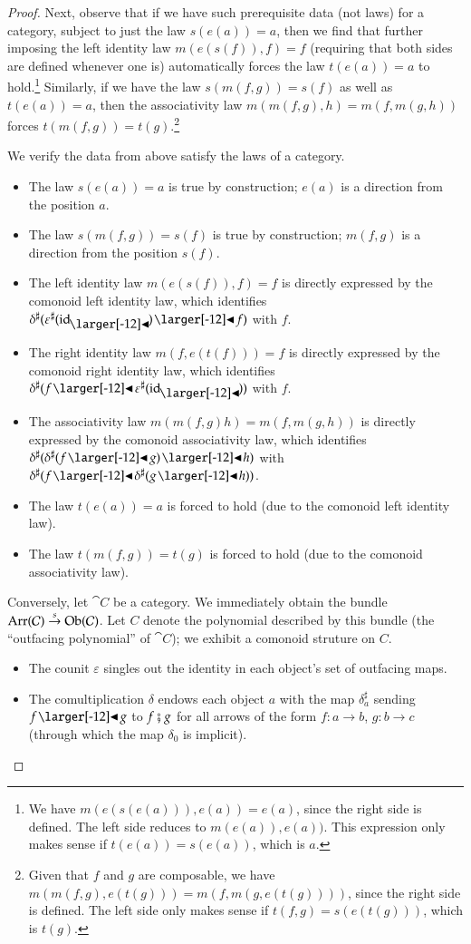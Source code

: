 \documentclass{amsart}
\begin{document}
\begin{proof}
  Next, observe that if we have such prerequisite data (not laws) for
  a category, subject to just the law $s(e(a)) = a$, then we find that
  further imposing the left identity law $m(e(s(f)), f) = f$
  (requiring that both sides are defined whenever one is)
  automatically forces the law $t(e(a)) = a$ to hold.\footnote{We have
    $m(e(s(e(a))), e(a)) = e(a)$, since the right side is defined. The
    left side reduces to $m(e(a)), e(a))$. This expression only makes
    sense if $t(e(a)) = s(e(a))$, which is $a$.}  Similarly, if we
  have the law $s(m(f,g))=s(f)$ as well as $t(e(a)) = a$, then the
  associativity law $m(m(f,g),h) = m(f,m(g,h))$ forces
  $t(m(f,g)) = t(g)$.\footnote{Given that $f$ and $g$ are composable,
    we have $m(m(f,g),e(t(g))) = m(f,m(g,e(t(g))))$, since the right
    side is defined. The left side only makes sense if
    $t(f,g) = s(e(t(g)))$, which is $t(g)$.}

  We verify the data from above satisfy the laws of a category.
  \begin{itemize}
  \item The law $s(e(a)) = a$ is true by construction; $e(a)$ is a
    direction from the position $a$.
  \item The law $s(m(f, g)) = s(f)$ is true by construction; $m(f, g)$
    is a direction from the position $s(f)$.
  \item The left identity law $m(e(s(f)), f) = f$ is directly
    expressed by the comonoid left identity law, which identifies
    ${\delta^\sharp(\varepsilon^\sharp(\idsubd) \subd f)}$ with $f$.
  \item The right identity law $m(f, e(t(f))) = f$ is directly
    expressed by the comonoid right identity law, which identifies
    ${\delta^\sharp(f \subd \varepsilon^\sharp(\idsubd))}$ with $f$.
  \item The associativity law $m(m(f, g) h) = m(f, m(g, h))$ is
    directly expressed by the comonoid associativity law, which
    identifies ${\delta^\sharp(\delta^\sharp(f \subd g) \subd h)}$ with
    ${\delta^\sharp(f \subd \delta^\sharp(g \subd h))}$.
  \item The law $t(e(a)) = a$ is forced to hold (due to the comonoid
    left identity law).
  \item The law $t(m(f, g)) = t(g)$ is forced to hold (due to the
    comonoid associativity law).
  \end{itemize}

  Conversely, let $\cat{C}$ be a category. We immediately obtain the
  bundle ${\operatorname{Arr}(\mathcal{C})\overset{s}{\to}\operatorname{Ob}(\mathcal{C})}$. Let $C$ denote
  the polynomial described by this bundle (the ``outfacing polynomial''
  of $\cat{C}$); we exhibit a comonoid struture on $C$.
  \begin{itemize}
  \item The counit $\varepsilon$ singles out the identity in each
    object's set of outfacing maps.
  \item The comultiplication $\delta$ endows each object $a$ with
    the map $\delta^\sharp_a$ sending $f \subd g$ to $f \fatsemi g$
    for all arrows of the form $f: a \to b$, $g: b \to c$ (through
    which the map $\delta_0$ is implicit).
  \end{itemize}


\end{proof}
\end{document}
